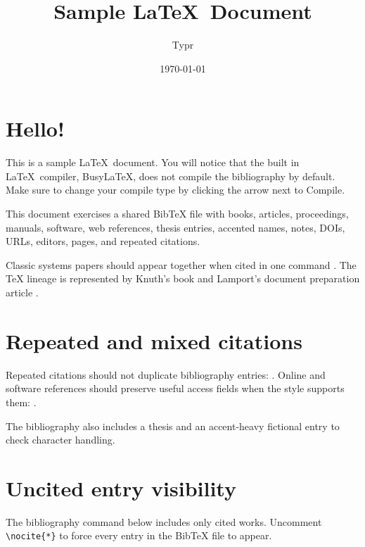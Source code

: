 \documentclass[11pt]{article}
\title{Sample \LaTeX \ Document}
\author{Typr}
\date{\today}
\begin{document}
  \maketitle

  \section{Hello!}
  This is a sample \LaTeX \ document.  You will notice that the built in \LaTeX \ compiler, BusyLaTeX, does not compile the bibliography by default.  Make sure to change your compile type by clicking the arrow next to Compile.

  This document exercises a shared BibTeX file with books, articles, proceedings,  manuals, software, web references, thesis entries, accented names, notes, DOIs,  URLs, editors, pages, and repeated citations.

  Classic systems papers should appear together when cited in one command \cite{turing1936computable,church1936unsolvable,mccarthy1960recursive}. The TeX lineage is represented by Knuth's book \cite{knuth1984texbook} and Lamport's document preparation article \cite{lamport1986document}.

  \section{Repeated and mixed citations}
  Repeated citations should not duplicate bibliography entries: \cite{knuth1984texbook,lamport1986document}. Online and software references should preserve useful access fields when the style supports them: \cite{typst2026docs,latexproject2026,svgedit2026}.

  The bibliography also includes a thesis \cite{shannon1940symbolic} and an accent-heavy fictional entry \cite{garcia2024accents} to check character handling.

  \section{Uncited entry visibility}
  The bibliography command below includes only cited works. Uncomment\verb| \nocite{*}| to force every entry in the BibTeX file to appear.

  
  
\end{document}
